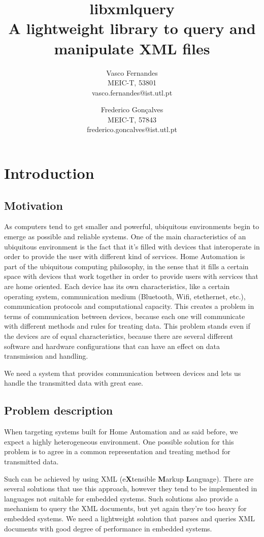 \documentclass[a4paper]{report}
\title{\textbf{\Huge{libxmlquery}}\\A lightweight library to query and manipulate XML files}
\author{
Vasco Fernandes\\
MEIC-T, 53801\\
vasco.fernandes@ist.utl.pt \\
\and
Frederico Gon\c{c}alves\\
MEIC-T, 57843\\
frederico.goncalves@ist.utl.pt\\
}
\begin{document}
\maketitle

\tableofcontents

\chapter{Introduction}

\section{Motivation} %
	As computers tend to get smaller and powerful, ubiquitous environments begin to emerge as possible and reliable systems. One of the main characteristics of an ubiquitous environment is the fact that it's filled with 
	devices that interoperate in order to provide the user with different kind of services. Home Automation is part of the ubiquitous computing philosophy, in the sense that it fills a certain space with devices that work together in 
	order to provide users with services that are home oriented. Each device has its own characteristics, like a certain operating system, communication medium (Bluetooth, Wifi, etethernet, etc.), communication protocols and 
	computational 	capacity. This creates a problem in terms of communication between devices, because each one will communicate with different methods and rules for treating data. This problem stands even if the devices 
	are of equal characteristics, because there are several different software and hardware configurations that can have an effect on data transmission and handling.
	
	We need a system that provides communication between devices and lets us handle the transmitted data with great ease.
	
\section{Problem description}
	When targeting systems built for Home Automation and as said before, we expect a highly heterogeneous environment. One possible solution for this problem is to agree in a common representation and treating method
	for transmitted data. 
	
	Such can be achieved by using XML (e\textbf{X}tensible \textbf{M}arkup \textbf{L}anguage). There are several solutions that use this approach, however they tend to be implemented in languages not suitable for 
	embedded systems. Such solutions also provide a mechanism to query the XML documents, but yet again they're too heavy for embedded systems. We need a lightweight solution that parses and queries XML 
	documents with good degree of performance in embedded systems.
	
\end{document}

